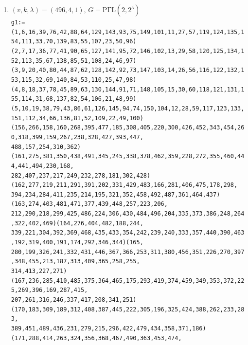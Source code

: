 \documentclass[a4paper,twopage,reqno,12pt]{amsart}
\theoremstyle{definition}
\numberwithin{equation}{section}
\newcommand{\PGaL}{\mathrm{P\Gamma L}}
\newcommand{\Aut}{\mathrm{Aut}}
\newcommand{\Z}{\mathrm{Z}}
\begin{document}
\begin{enumerate}
    \item\label{49641} $(v,k,\lambda)=(496,4,1)$, $G=\PGaL(2,2^5)$\\
    {\tiny
\texttt{g1:=(1,6,16,39,76,42,88,64,129,143,93,75,149,101,11,27,57,119,124,135,154,111,33,70,139,83,55,107,23,50,96)\\
(2,7,17,36,77,41,90,65,127,141,95,72,146,102,13,29,58,120,125,134,152,113,35,67,138,85,51,108,24,46,97)\\
(3,9,20,40,80,44,87,62,128,142,92,73,147,103,14,26,56,116,122,132,153,115,32,69,140,84,53,110,25,47,98)\\
(4,8,18,37,78,45,89,63,130,144,91,71,148,105,15,30,60,118,121,131,155,114,31,68,137,82,54,106,21,48,99)\\
(5,10,19,38,79,43,86,61,126,145,94,74,150,104,12,28,59,117,123,133,151,112,34,66,136,81,52,109,22,49,100)\\
(156,266,158,160,268,395,477,185,308,405,220,300,426,452,343,454,260,318,399,159,267,238,328,427,393,447,\\
488,157,254,310,362)(161,275,381,350,438,491,345,245,338,378,462,359,228,272,355,460,444,441,494,230,168,\\
282,407,237,217,249,232,278,181,302,428)(162,277,219,211,291,391,202,331,429,483,166,281,406,475,178,298,\\
394,234,284,411,235,214,195,321,352,458,492,487,361,464,437)(163,274,403,481,471,377,439,448,257,223,206,\\
212,290,218,299,425,486,224,306,430,484,496,204,335,373,386,248,264,322,402,469)(164,276,404,482,188,244,\\
339,221,304,392,369,468,435,433,354,242,239,240,333,357,440,390,463,192,319,400,191,174,292,346,344)(165,\\
280,199,326,241,332,431,446,367,366,253,311,380,456,351,226,270,397,348,455,213,187,313,409,365,258,255,\\
314,413,227,271)(167,236,285,410,485,375,364,465,175,293,419,374,459,349,353,372,225,269,396,169,287,415,\\
207,261,316,246,337,417,208,341,251)(170,183,309,189,312,408,387,445,222,305,196,325,424,388,262,233,283,\\
389,451,489,436,231,279,215,296,422,479,434,358,371,186)(171,288,414,263,324,356,368,467,490,363,453,474,\\
}}
\end{enumerate}
\end{document}
